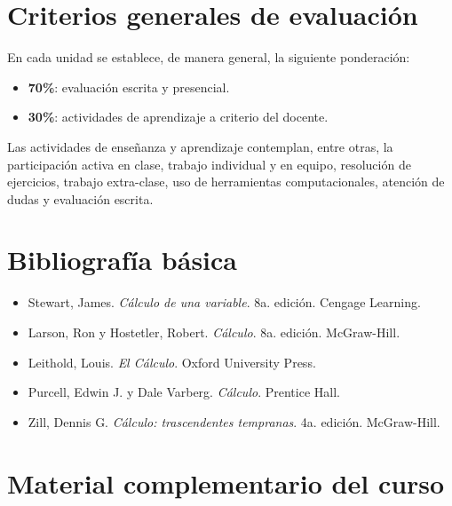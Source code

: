 \documentclass[12pt]{article}
\begin{document}
\section{Criterios generales de evaluación}

En cada unidad se establece, de manera general, la siguiente ponderación:

\begin{itemize}
    \item \textbf{70\%}: evaluación escrita y presencial.
    \item \textbf{30\%}: actividades de aprendizaje a criterio del docente.
\end{itemize}

Las actividades de enseñanza y aprendizaje contemplan, entre otras, la participación activa en clase, trabajo individual y en equipo, resolución de ejercicios, trabajo extra-clase, uso de herramientas computacionales, atención de dudas y evaluación escrita.

\section{Bibliografía básica}

\begin{itemize}
    \item Stewart, James. \textit{Cálculo de una variable}. 8a. edición. Cengage Learning.
    \item Larson, Ron y Hostetler, Robert. \textit{Cálculo}. 8a. edición. McGraw-Hill.
    \item Leithold, Louis. \textit{El Cálculo}. Oxford University Press.
    \item Purcell, Edwin J. y Dale Varberg. \textit{Cálculo}. Prentice Hall.
    \item Zill, Dennis G. \textit{Cálculo: trascendentes tempranas}. 4a. edición. McGraw-Hill.
\end{itemize}

\newpage

\section{Material complementario del curso}

%
%
%
%
%
\end{document}
